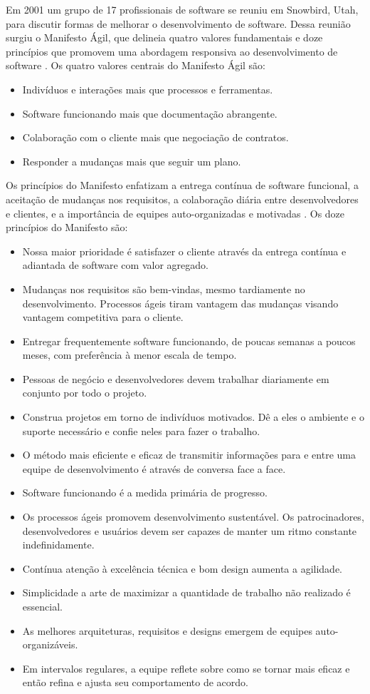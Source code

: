 \documentclass[
	12pt,
	openright,
	twoside,
	a4paper,
	english,
	brazil
	]{abntex2}
\begin{document}
Em 2001 um grupo de 17 profissionais de software se reuniu em Snowbird, Utah, para discutir formas de melhorar o desenvolvimento de software. Dessa reunião surgiu o Manifesto Ágil, que delineia quatro valores fundamentais e doze princípios que promovem uma abordagem responsiva ao desenvolvimento de software \cite{AgileManifest}. Os quatro valores centrais do Manifesto Ágil são:

\begin{itemize}
  \item Indivíduos e interações mais que processos e ferramentas.
  \item Software funcionando mais que documentação abrangente.
  \item Colaboração com o cliente mais que negociação de contratos.
  \item Responder a mudanças mais que seguir um plano.
\end{itemize}
  
Os princípios do Manifesto enfatizam a entrega contínua de software funcional, a aceitação de mudanças nos requisitos, a colaboração diária entre desenvolvedores e clientes, e a importância de equipes auto-organizadas e motivadas \cite{AgileManifest}. Os doze princípios do Manifesto são:
\begin{itemize}
  \item Nossa maior prioridade é satisfazer o cliente através da entrega contínua e adiantada de software com valor agregado.  
  \item Mudanças nos requisitos são bem-vindas, mesmo tardiamente no desenvolvimento. Processos ágeis tiram vantagem das mudanças visando vantagem competitiva para o cliente.  
  \item Entregar frequentemente software funcionando, de poucas semanas a poucos meses, com preferência à menor escala de tempo.  
  \item Pessoas de negócio e desenvolvedores devem trabalhar diariamente em conjunto por todo o projeto.  
  \item Construa projetos em torno de indivíduos motivados. Dê a eles o ambiente e o suporte necessário e confie neles para fazer o trabalho.  
  \item O método mais eficiente e eficaz de transmitir informações para e entre uma equipe de desenvolvimento é através de conversa face a face.  
  \item Software funcionando é a medida primária de progresso.  
  \item Os processos ágeis promovem desenvolvimento sustentável. Os patrocinadores, desenvolvedores e usuários devem ser capazes de manter um ritmo constante indefinidamente.  
  \item Contínua atenção à excelência técnica e bom design aumenta a agilidade.  
  \item Simplicidade \- a arte de maximizar a quantidade de trabalho não realizado \- é essencial.  
  \item As melhores arquiteturas, requisitos e designs emergem de equipes auto-organizáveis.  
  \item Em intervalos regulares, a equipe reflete sobre como se tornar mais eficaz e então refina e ajusta seu comportamento de acordo.
\end{itemize}
\end{document}
